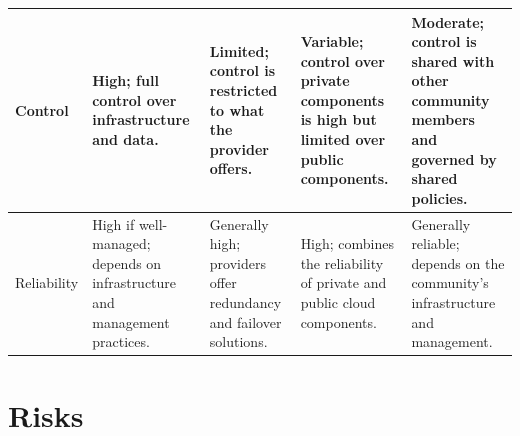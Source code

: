 \begin{longtable}{|p{2cm}| p{3cm} |p{3cm} |p{3cm}|p{3cm}|}
\hline
Control & High; full control over infrastructure and data. & Limited; control is restricted to what the provider offers. & Variable; control over private components is high but limited over public components. & Moderate; control is shared with other community members and governed by shared policies. \\
\hline
Reliability & High if well-managed; depends on infrastructure and management practices. & Generally high; providers offer redundancy and failover solutions. & High; combines the reliability of private and public cloud components. & Generally reliable; depends on the community's infrastructure and management. \\
\hline
\end{longtable}
\endgroup

\section{Risks}
